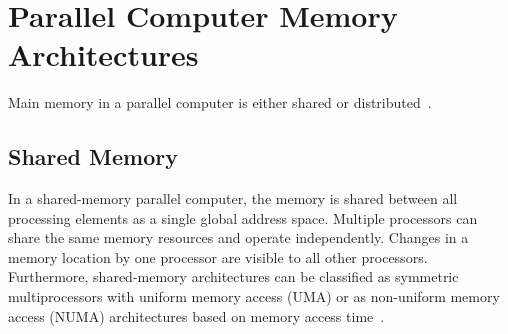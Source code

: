 \section{Parallel Computer Memory Architectures}
Main memory in a parallel computer is either shared or distributed~\cite{patterson2013computer}.

\subsection{Shared Memory}
In a shared-memory parallel computer, the memory is shared between all processing elements as a single global address space. Multiple processors can share the same memory resources and operate independently. Changes in a memory location by one processor are visible to all other processors.\\ 
Furthermore, shared-memory architectures can be classified as symmetric multiprocessors with uniform memory access (UMA) or as non-uniform memory access (NUMA) architectures based on memory access time~\cite{kshemkalyani2008distributed,sutter2005free}.

